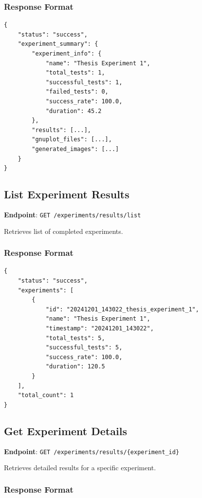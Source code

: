 \subsubsection{Response Format}
\label{subsubsec:experiment-response}

\begin{verbatim}
{
    "status": "success",
    "experiment_summary": {
        "experiment_info": {
            "name": "Thesis Experiment 1",
            "total_tests": 1,
            "successful_tests": 1,
            "failed_tests": 0,
            "success_rate": 100.0,
            "duration": 45.2
        },
        "results": [...],
        "gnuplot_files": [...],
        "generated_images": [...]
    }
}
\end{verbatim}

\subsection{List Experiment Results}
\label{subsec:list-experiments}

\textbf{Endpoint}: \texttt{GET /experiments/results/list}

Retrieves list of completed experiments.

\subsubsection{Response Format}
\label{subsubsec:experiments-list}

\begin{verbatim}
{
    "status": "success",
    "experiments": [
        {
            "id": "20241201_143022_thesis_experiment_1",
            "name": "Thesis Experiment 1",
            "timestamp": "20241201_143022",
            "total_tests": 5,
            "successful_tests": 5,
            "success_rate": 100.0,
            "duration": 120.5
        }
    ],
    "total_count": 1
}
\end{verbatim}

\subsection{Get Experiment Details}
\label{subsec:experiment-details}

\textbf{Endpoint}: \texttt{GET /experiments/results/\{experiment\_id\}}

Retrieves detailed results for a specific experiment.

\subsubsection{Response Format}
\label{subsubsec:experiment-detail}

